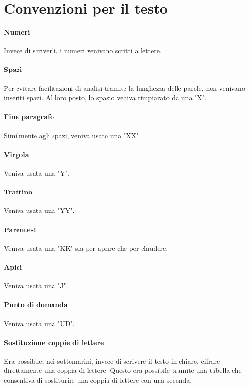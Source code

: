\section{Convenzioni per il testo}

\paragraph{Numeri}
Invece di scriverli, i numeri venivano scritti a lettere.

\paragraph{Spazi}
Per evitare facilitazioni di analisi tramite la lunghezza delle parole,
non venivano inseriti spazi.
Al loro posto, lo spazio veniva rimpiazato da una "X".

\paragraph{Fine paragrafo}
Similmente agli spazi, veniva usato una "XX".

\paragraph{Virgola}
Veniva usata una "Y".

\paragraph{Trattino}
Veniva usata una "YY".

\paragraph{Parentesi}
Veniva usata una "KK" sia per aprire che per chiudere.

\paragraph{Apici}
Veniva usata una "J".

\paragraph{Punto di domanda}
Veniva usata una "UD".

\paragraph{Sostituzione coppie di lettere}
Era possibile, nei sottomarini, invece di scrivere il testo in chiaro, cifrare direttamente una coppia di lettere.
Questo era possibile tramite una tabella che consentiva di sostiturire una coppia di lettere con una seconda.

